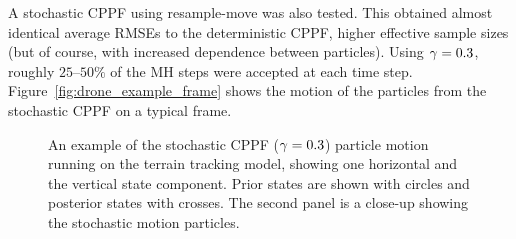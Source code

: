 \documentclass{article}
\begin{document}
A stochastic CPPF using resample-move was also tested. This obtained almost identical average RMSEs to the deterministic CPPF, higher effective sample sizes (but of course, with increased dependence between particles). Using $\gamma=0.3$, roughly $25$--$50\%$ of the MH steps were accepted at each time step. Figure~\ref{fig:drone_example_frame} shows the motion of the particles from the stochastic CPPF on a typical frame.
%
\begin{figure}
\centering
{}
\caption{An example of the stochastic CPPF ($\gamma=0.3$) particle motion running on the terrain tracking model, showing one horizontal and the vertical state component. Prior states are shown with circles and posterior states with crosses. The second panel is a close-up showing the stochastic motion particles.}
\label{fig:drone_example_frame_stochastic}
\end{figure}
\end{document}

